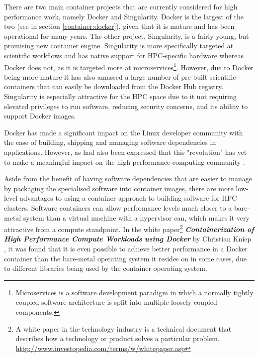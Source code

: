 There are two main container projects that are currently considered for high performance work, namely Docker and Singularity. Docker is the largest of the two (see  in section \ref{container:docker}), given that it is mature and has been operational for many years. The other project, Singularity, is a fairly young, but promising new container engine. Singularity is more specifically targeted at scientific workflows and has native support for HPC-specific hardware whereas Docker does not, as it is targeted more at microservices\footnote{Microservices is a software development paradigm in which a normally tightly coupled software architecture is split into multiple loosely coupled components.}. However, due to Docker being more mature it has also amassed a large number of pre-built scientific containers that can easily be downloaded from the Docker Hub registry. Singularity is especially attractive for the HPC space due to it not requiring elevated privileges to run software, reducing security concerns, and its ability to support Docker images.

Docker has made a significant impact on the Linux developer community with the ease of building, shipping and managing software dependencies in applications. However, as had also been expressed that this "revolution" \parencite{jacobsen2015contain} has yet to make a meaningful impact on the high performance computing community \parencite{yu2015building,xavier2013performance}.

Aside from the benefit of having software dependencies that are easier to manage by packaging the specialised software into container images, there are more low-level advantages to using a container approach to building software for HPC clusters. Software containers can allow performance levels much closer to a bare-metal system than a virtual machine with a hypervisor can, which makes it very attractive from a compute standpoint. In the white paper\footnote{A white paper in the technology industry is a technical document that describes how a technology or product solves a particular problem. \url{http://www.investopedia.com/terms/w/whitepaper.asp}} \textbf{\textit{Containerization of High Performance Compute Workloads using Docker}} by Christian Kniep \parencite{kniep2014containerization}, it was found that it is even possible to achieve better performance in a Docker container than the bare-metal operating system it resides on in some cases, due to different libraries being used by the container operating system.

